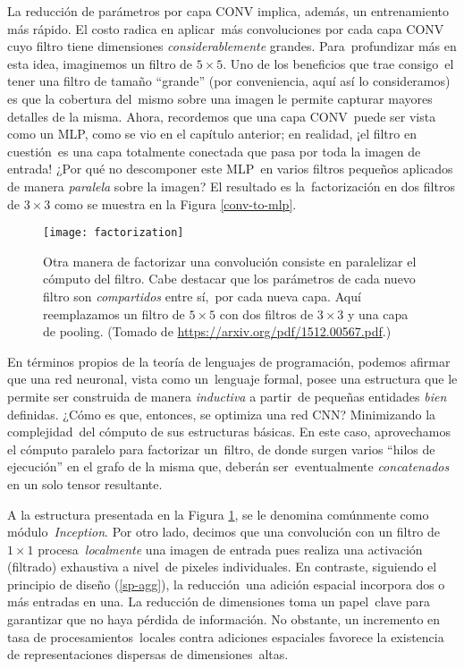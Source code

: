 La reducción de parámetros por capa CONV implica, además, un entrenamiento más rápido. El costo radica en aplicar\
más convoluciones por cada capa CONV cuyo filtro tiene dimensiones \emph{considerablemente} grandes. Para\
profundizar más en esta idea, imaginemos un filtro de $5 \times 5$. Uno de los beneficios que trae consigo\
el tener una filtro de tamaño ``grande'' (por conveniencia, aquí así lo consideramos) es que la cobertura del\
mismo sobre una imagen le permite capturar mayores detalles de la misma. Ahora, recordemos que una capa CONV\
puede ser vista como un MLP, como se vio en el capítulo anterior; en realidad, ¡el filtro en cuestión\
es una capa totalmente conectada que pasa por toda la imagen de entrada! ¿Por qué no descomponer este MLP\
en varios filtros pequeños aplicados de manera \emph{paralela} sobre la imagen? El resultado es la\
factorización en dos filtros de $3 \times 3$ como se muestra en la Figura \ref{conv-to-mlp}.\par

\begin{figure}[H]
  \centering
  \texttt{[image: factorization]}
  \caption{Otra manera de factorizar una convolución consiste en paralelizar el cómputo del filtro.
    Cabe destacar que los parámetros de cada nuevo filtro son \emph{compartidos} entre sí,\
    por cada nueva capa. Aquí reemplazamos un filtro de $5 \times 5$ con dos filtros de $3 \times 3$
    y una capa de pooling.
    (Tomado de \url{https://arxiv.org/pdf/1512.00567.pdf}.)}
  \label{factorization}
\end{figure}

En términos propios de la teoría de lenguajes de programación, podemos afirmar que una red neuronal, vista como un\
lenguaje formal, posee una estructura que le permite ser construida de manera \emph{inductiva} a partir\
de pequeñas entidades \emph{bien} definidas. ¿Cómo es que, entonces, se optimiza una red CNN? Minimizando la complejidad\
del cómputo de sus estructuras básicas. En este caso, aprovechamos el cómputo paralelo para factorizar un\
filtro, de donde surgen varios ``hilos de ejecución'' en el grafo de la misma que, deberán ser\
eventualmente \emph{concatenados} en un solo tensor resultante.\par
A la estructura presentada en la Figura \ref{factorization}, se le denomina comúnmente como módulo\
\emph{Inception}. Por otro lado, decimos que una convolución con un filtro de $1 \times 1$ procesa\
\emph{localmente} una imagen de entrada pues realiza una activación (filtrado) exhaustiva a nivel\
de pixeles individuales. En contraste, siguiendo el principio de diseño (\ref{sp-agg}), la reducción\
una adición espacial incorpora dos o más entradas en una. La reducción de dimensiones toma un papel\
clave para garantizar que no haya pérdida de información. No obstante, un incremento en tasa de procesamientos\
locales contra adiciones espaciales favorece la existencia de representaciones dispersas de dimensiones\
altas.

